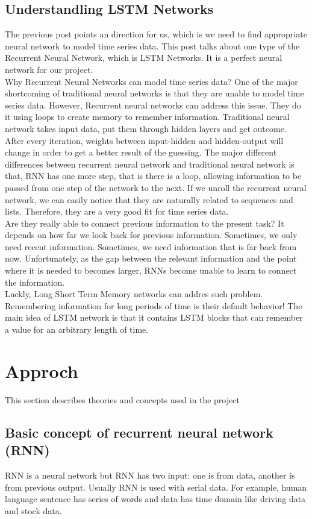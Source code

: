 \documentclass[12pt]{article}
\begin{document}
\subsection{Understandling LSTM Networks}
The previous post points an direction for us, which is we need to find appropriate neural network to model time series data. This post talks about one type of the Recurrent Neural Network, which is LSTM Networks. It is a perfect neural network for our project. \\
Why Recurrent Neural Networks can model time series data? One of the major shortcoming of traditional neural networks is that they are unable to model time series data. However, Recurrent neural networks can address this issue. They do it using loops to create memory to remember information. Traditional neural network takes input data, put them through hidden layers and get outcome. After every iteration, weights between input-hidden and hidden-output will change in order to get a better result of the guessing. The major different differences between recurrent neural network and traditional neural network is that, RNN has one more step, that is there is a loop, allowing information to be passed from one step of the network to the next. If we unroll the recurrent neural network, we can easily notice that they are naturally related to sequences and lists. Therefore, they are a very good fit for time series data.\\
Are they really able to connect previous information to the present task? It depends on how far we look back for previous information. Sometimes, we only need recent information. Sometimes, we need information that is far back from now. Unfortunately, as the gap between the relevant information and the point where it is needed to becomes larger, RNNs become unable to learn to connect the information.\\
Luckly, Long Short Term Memory networks can addres such problem. Remembering information for long periods of time is their default behavior! The main idea of LSTM network is that it contains LSTM blocks that can remember a value for an arbitrary length of time.

\section{Approch}
\label{sec:sim}
This section describes theories and concepts used in the project

\subsection{Basic concept of recurrent neural network (RNN)}
RNN is a neural network but RNN has two input: one is from data, another is from previous output. Usually RNN is used with serial data. For example, human language sentence has series of words and data has time domain like driving data and stock data.
\end{document}
